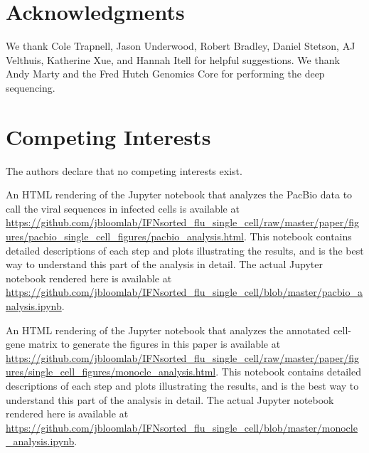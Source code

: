 \documentclass[9pt,lineno]{elife}
\begin{document}
\section{Acknowledgments}
We thank Cole Trapnell, Jason Underwood, Robert Bradley, Daniel Stetson, AJ Velthuis, Katherine Xue, and Hannah Itell for helpful suggestions.
We thank Andy Marty and the Fred Hutch Genomics Core for performing the deep sequencing.

\section{Competing Interests}
The authors declare that no competing interests exist.

\nolinenumbers



\clearpage

\begin{suppfile}
\caption{\label{suppfile:pacbio_analysis}
An HTML rendering of the Jupyter notebook that analyzes the PacBio data to call the viral sequences in infected cells is available at \url{https://github.com/jbloomlab/IFNsorted_flu_single_cell/raw/master/paper/figures/pacbio_single_cell_figures/pacbio_analysis.html}.
This notebook contains detailed descriptions of each step and plots illustrating the results, and is the best way to understand this part of the analysis in detail.
The actual Jupyter notebook rendered here is available at \url{https://github.com/jbloomlab/IFNsorted_flu_single_cell/blob/master/pacbio_analysis.ipynb}.}
\end{suppfile}

\begin{suppfile}
\caption{\label{suppfile:monocle_analysis}
An HTML rendering of the Jupyter notebook that analyzes the annotated cell-gene matrix to generate the figures in this paper is available at \url{https://github.com/jbloomlab/IFNsorted_flu_single_cell/raw/master/paper/figures/single_cell_figures/monocle_analysis.html}.
This notebook contains detailed descriptions of each step and plots illustrating the results, and is the best way to understand this part of the analysis in detail.
The actual Jupyter notebook rendered here is available at \url{https://github.com/jbloomlab/IFNsorted_flu_single_cell/blob/master/monocle_analysis.ipynb}.}
\end{suppfile}
\end{document}
